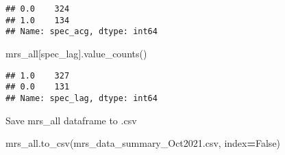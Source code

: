\documentclass[
]{article}
\newenvironment{Shaded}{\begin{snugshade}}{\end{snugshade}}
\newcommand{\NormalTok}[1]{#1}
\newcommand{\OperatorTok}[1]{\textcolor[rgb]{0.81,0.36,0.00}{\textbf{#1}}}
\newcommand{\StringTok}[1]{\textcolor[rgb]{0.31,0.60,0.02}{#1}}
\newcommand{\VariableTok}[1]{\textcolor[rgb]{0.00,0.00,0.00}{#1}}
\begin{document}
\begin{verbatim}
## 0.0    324
## 1.0    134
## Name: spec_acg, dtype: int64
\end{verbatim}

\begin{Shaded}
\begin{Highlighting}[]
\NormalTok{mrs\_all[}\StringTok{\textquotesingle{}spec\_lag\textquotesingle{}}\NormalTok{].value\_counts()}
\end{Highlighting}
\end{Shaded}

\begin{verbatim}
## 1.0    327
## 0.0    131
## Name: spec_lag, dtype: int64
\end{verbatim}

Save mrs\_all dataframe to .csv

\begin{Shaded}
\begin{Highlighting}[]
\NormalTok{mrs\_all.to\_csv(}\StringTok{\textquotesingle{}mrs\_data\_summary\_Oct2021.csv\textquotesingle{}}\NormalTok{, index}\OperatorTok{=}\VariableTok{False}\NormalTok{)}
\end{Highlighting}
\end{Shaded}
\end{document}

